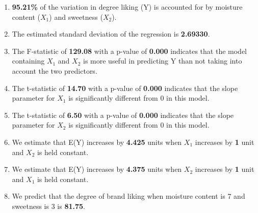 \documentclass{article}
\begin{document}
\begin{enumerate}
\def\labelenumi{\alph{enumi})}
\item
  \textbf{95.21\%} of the variation in degree liking (Y) is accounted
  for by moisture content (\(X_1\)) and sweetness (\(X_2\)).
\item
  The estimated standard deviation of the regression is
  \textbf{2.69330}.
\item
  The F-statistic of \textbf{129.08} with a p-value of \textbf{0.000}
  indicates that the model containing \(X_1\) and \(X_2\) is more useful
  in predicting Y than not taking into account the two predictors.
\item
  The t-statistic of \textbf{14.70} with a p-value of \textbf{0.000}
  indicates that the slope parameter for \(X_1\) is significantly
  different from 0 in this model.
\item
  The t-statistic of \textbf{6.50} with a p-value of \textbf{0.000}
  indicates that the slope parameter for \(X_2\) is significantly
  different from 0 in this model.
\item
  We estimate that E(Y) increases by \textbf{4.425} units when \(X_1\)
  increases by \textbf{1} unit and \(X_2\) is held constant.
\item
  We estimate that E(Y) increases by \textbf{4.375} units when \(X_2\)
  increases by \textbf{1} unit and \(X_1\) is held constant.
\item
  We predict that the degree of brand liking when moisture content is 7
  and sweetness is 3 is \textbf{81.75}.
\end{enumerate}


    
    
    
    
\end{document}
